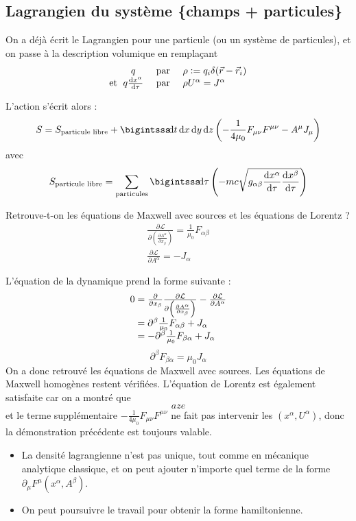 \subsection{Lagrangien du système \{champs + particules\}}
On a déjà écrit le Lagrangien pour une particule (ou un système de particules), et on passe à la description volumique en remplaçant 
$$
	\begin{array}{r@{\;}ccl}
		&q&\text{ par }&\rho\defeq q_i\delta(\vec{r}-\vec{r}_i)\\
		\text{et }&q\frac{\dif x^\alpha}{\dif \tau}&\text{ par }&\rho U^\alpha=J^\alpha
	\end{array}
$$

L'action s'écrit alors :
$$
	S=S_{\text{particule libre}}+\bigintsss\!\dif t\,\dif x\,\dif y\,\dif z\left(-\frac{1}{4\mu_0}F_{\mu\nu}F^{\mu\nu}-A^\mu J_\mu\right)
$$
avec 
$$
	S_{\text{particule libre}}=\sum_{\text{particules}}\bigintsss\!\dif\tau\left(-mc\sqrt{g_{\alpha\beta}\frac{\dif x^\alpha}{\dif\tau}\frac{\dif x^\beta}{\dif\tau}}\right)
$$

Retrouve-t-on les équations de Maxwell avec sources et les équations de Lorentz ?
$$
	\begin{array}{c}
		\frac{\partial\mathcal{L}}{\partial\left(\frac{\partial A^{\alpha}}{\partial x_{\beta}}\right)}=\frac{1}{\mu_0}F_{\alpha\beta}\\
		\frac{\partial \mathcal{L}}{\partial A^\alpha}=-J_\alpha
	\end{array}
$$

L'équation de la dynamique prend la forme suivante :
$$
	\begin{array}{r@{\;}l}
		0&=\frac{\partial}{\partial x_{\beta}}\frac{\partial\mathcal{L}}{\partial\left(\frac{\partial A^\alpha}{\partial x_{\beta}}\right)}-\frac{\partial\mathcal{L}}{\partial A^\alpha}\\
		&=\partial^\beta\frac{1}{\mu_0}F_{\alpha\beta}+J_\alpha\\
		&=-\partial^\beta\frac{1}{\mu_0}F_{\beta\alpha}+J_\alpha
	\end{array}
$$
$$
	\boxed{\partial^\beta F_{\beta\alpha}=\mu_0 J_\alpha}
$$
On a donc retrouvé les équations de Maxwell avec sources. Les équations de Maxwell homogènes restent vérifiées. L'équation de Lorentz est également satisfaite car on a montré que 
$$
aze	
$$
{\txt et le terme supplémentaire $-\frac{1}{4\mu_0}F_{\mu\nu}F^{\mu\nu}$ ne fait pas intervenir les $(x^\alpha,U^\alpha)$, donc la démonstration précédente est toujours valable.}

\begin{remarks}\hspace*{1em}
	\begin{itemize}
		\item La densité lagrangienne n'est pas unique, tout comme en mécanique analytique classique, et on peut ajouter n'importe quel terme de la forme $\partial_\mu F^\mu(x^\alpha,A^\beta)$.
		\item On peut poursuivre le travail pour obtenir la forme hamiltonienne.
	\end{itemize}
\end{remarks}

